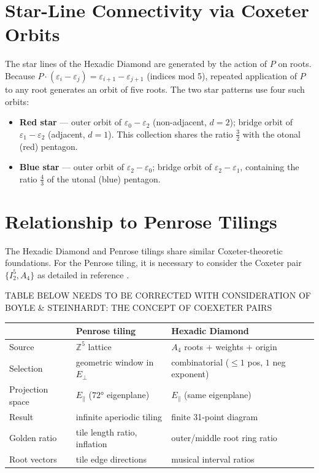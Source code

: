 \documentclass[11pt]{article}
\begin{document}
\section{Star-Line Connectivity via Coxeter Orbits}

The star lines of the Hexadic Diamond are generated by the action of $P$ on
roots. Because $P \cdot (\varepsilon_i - \varepsilon_j) = \varepsilon_{i+1} -
\varepsilon_{j+1}$ (indices mod 5), repeated application of $P$ to any root
generates an orbit of five roots. The two star patterns use four such orbits:

\begin{itemize}
  \item \textbf{Red star} --- outer orbit of $\varepsilon_0 - \varepsilon_2$
        (non-adjacent, $d=2$); bridge orbit of $\varepsilon_1 - \varepsilon_2$
        (adjacent, $d=1$). This collection shares the ratio $\frac{3}{2}$ with the otonal (red) pentagon.
  \item \textbf{Blue star} --- outer orbit of $\varepsilon_2 - \varepsilon_0$;
        bridge orbit of $\varepsilon_2 - \varepsilon_1$, containing the ratio $\frac{4}{3}$ of the utonal (blue) pentagon.
\end{itemize}

\section{Relationship to Penrose Tilings}

The Hexadic Diamond and Penrose tilings share similar Coxeter-theoretic
foundations.  For the Penrose tiling, it is necessary to consider the Coxeter pair $\{I^5_2,A_4\}$ as detailed in reference \cite{boyleSteinhardt2022}.

TABLE BELOW NEEDS TO BE CORRECTED WITH CONSIDERATION OF BOYLE \& STEINHARDT: THE CONCEPT OF COEXETER PAIRS

\begin{center}
\begin{tabular}{lll}
  \toprule
  & Penrose tiling & Hexadic Diamond \\
  \midrule
  Source         & $\mathbb{Z}^5$ lattice & $A_4$ roots + weights + origin \\
  Selection      & geometric window in $E_\perp$ & combinatorial ($\leq 1$ pos, $1$ neg exponent) \\
  Projection space & $E_\parallel$ ($72°$ eigenplane) & $E_\parallel$ (same eigenplane) \\
  Result         & infinite aperiodic tiling & finite 31-point diagram \\
  Golden ratio   & tile length ratio, inflation & outer/middle root ring ratio \\
  Root vectors   & tile edge directions & musical interval ratios \\
  \bottomrule
\end{tabular}
\end{center}
\end{document}
